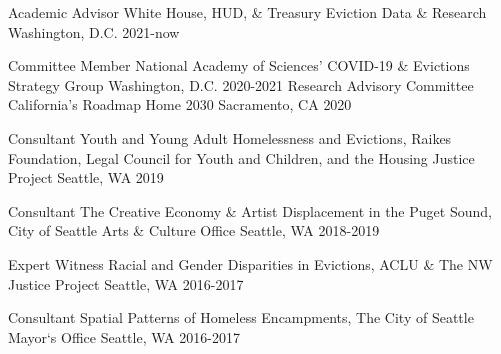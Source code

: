 
\begin{cvhonors}

  \cvhonor
    {Academic Advisor} %
    {White House, HUD, \& Treasury Eviction Data \& Research} %
    {Washington, D.C.} %
    {2021-now} %
    
  \cvhonor
    {Committee Member} %
    {National Academy of Sciences' COVID-19 \& Evictions Strategy Group} %
    {Washington, D.C.} %
    {2020-2021} %
  \cvhonor
    {Research Advisory Committee} %
    {California's Roadmap Home 2030} %
    {Sacramento, CA} %
    {2020} %
    
  \cvhonor
    {Consultant} %
    {Youth and Young Adult Homelessness and Evictions, Raikes Foundation, Legal Council for Youth and Children, and the Housing Justice Project} %
    {Seattle, WA} %
    {2019} %

  \cvhonor
    {Consultant} %
    {The Creative Economy \& Artist Displacement in the Puget Sound, City of Seattle Arts \& Culture Office} %
    {Seattle, WA} %
    {2018-2019} %

  \cvhonor
    {Expert Witness} %
    {Racial and Gender Disparities in Evictions, ACLU \& The NW Justice Project} %
    {Seattle, WA} %
    {2016-2017} %

  \cvhonor
    {Consultant} %
    {Spatial Patterns of Homeless Encampments, The City of Seattle Mayor‘s Office} %
    {Seattle, WA} %
    {2016-2017} %

\end{cvhonors}